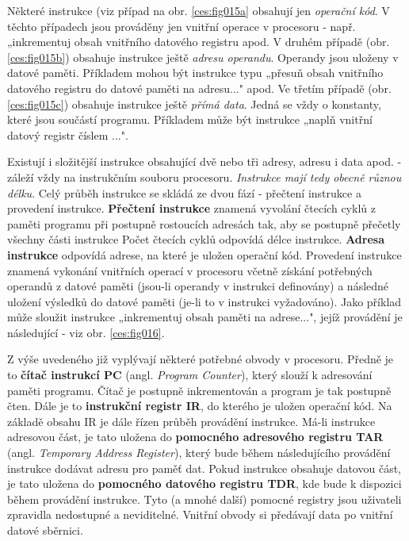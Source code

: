     Některé instrukce (viz případ na obr. \ref{ces:fig015a} obsahují jen \emph{operační 
    kód}. V těchto případech jsou prováděny jen vnitřní operace v procesoru - např. „inkrementuj 
    obsah vnitřního datového registru apod. V druhém případě (obr. \ref{ces:fig015b}) 
    obsahuje instrukce ještě \emph{adresu operandu}. Operandy jsou uloženy v datové paměti. 
    Příkladem mohou být instrukce typu „přesuň obsah vnitřního datového registru do datové paměti 
    na adresu..." apod. Ve třetím případě (obr. \ref{ces:fig015c}) obsahuje instrukce ještě 
    \emph{přímá data}. Jedná se vždy o konstanty, které jsou součástí programu. Příkladem může být 
    instrukce „naplň vnitřní datový registr číslem ...".
    
    Existují i složitější instrukce obsahující dvě nebo tři adresy, adresu i data apod. - záleží 
    vždy na instrukčním souboru procesoru. \emph{Instrukce mají tedy obecně různou délku}. Celý 
    průběh instrukce se skládá ze dvou fází - přečtení instrukce a provedení instrukce. 
    \textbf{Přečtení instrukce} znamená vyvolání čtecích cyklů z paměti programu při postupně 
    rostoucích adresách tak, aby se postupně přečetly všechny části instrukce Počet čtecích cyklů 
    odpovídá délce instrukce. \textbf{Adresa instrukce} odpovídá adrese, na které je uložen 
    operační kód. Provedení instrukce znamená vykonání vnitřních operací v procesoru včetně získání 
    potřebných operandů z datové paměti (jsou-li operandy v instrukci definovány) a následné 
    uložení výsledků do datové paměti (je-li to v instrukci vyžadováno). Jako příklad může sloužit 
    instrukce „inkrementuj obsah paměti na adrese...", jejíž provádění je následující - viz obr. 
    \ref{ces:fig016}.

    
    Z výše uvedeného již vyplývají některé potřebné obvody v procesoru. Předně je to \textbf{čítač 
    instrukcí PC} (angl. \emph{Program Counter}), který slouží k adresování paměti programu. Čítač 
    je postupně inkrementován a program je tak postupně čten. Dále je to \textbf{instrukční registr 
    IR}, do kterého je uložen operační kód. Na základě obsahu IR je dále řízen průběh provádění 
    instrukce. Má-li instrukce adresovou část, je tato uložena do \textbf{pomocného adresového 
    registru TAR} (angl. \emph{Temporary Address Register}), který bude během následujícího 
    provádění instrukce dodávat adresu pro paměť dat. Pokud instrukce obsahuje datovou část, je 
    tato uložena do \textbf{pomocného datového registru TDR}, kde bude k dispozici během provádění 
    instrukce. Tyto (a mnohé další) pomocné registry jsou uživateli zpravidla nedostupné a 
    neviditelné. Vnitřní obvody si předávají data po vnitřní datové sběrnici.
    
